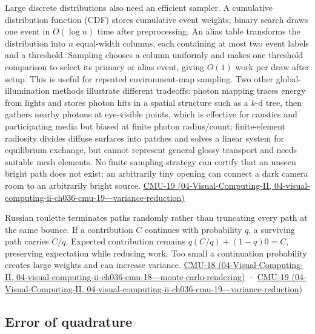 Large discrete distributions also need an efficient sampler. A cumulative distribution function (CDF) stores cumulative event weights; binary search draws one event in \(O(\log n)\) time after preprocessing. An alias table transforms the distribution into \(n\) equal-width columns, each containing at most two event labels and a threshold. Sampling chooses a column uniformly and makes one threshold comparison to select its primary or alias event, giving \(O(1)\) work per draw after setup. This is useful for repeated environment-map sampling. Two other global-illumination methods illustrate different tradeoffs: photon mapping traces energy from lights and stores photon hits in a spatial structure such as a \(k\)-d tree, then gathers nearby photons at eye-visible points, which is effective for caustics and participating media but biased at finite photon radius/count; finite-element radiosity divides diffuse surfaces into patches and solves a linear system for equilibrium exchange, but cannot represent general glossy transport and needs suitable mesh elements. No finite sampling strategy can certify that an unseen bright path does not exist: an arbitrarily tiny opening can connect a dark camera room to an arbitrarily bright source. \href{../04-Visual-Computing-II/main.pdf\#nameddest=04-visual-computing-ii-ch036-cmu-19---variance-reduction}{CMU-19 (04-Visual-Computing-II, 04-visual-computing-ii-ch036-cmu-19-\/-\/-variance-reduction)}

Russian roulette terminates paths randomly rather than truncating every path at the same bounce. If a contribution \(C\) continues with probability \(q\), a surviving path carries \(C/q\). Expected contribution remains \(q(C/q)+(1-q)0=C\), preserving expectation while reducing work. Too small a continuation probability creates large weights and can increase variance. \href{../04-Visual-Computing-II/main.pdf\#nameddest=04-visual-computing-ii-ch036-cmu-18---monte-carlo-rendering}{CMU-18 (04-Visual-Computing-II, 04-visual-computing-ii-ch036-cmu-18-\/-\/-monte-carlo-rendering)} · \href{../04-Visual-Computing-II/main.pdf\#nameddest=04-visual-computing-ii-ch036-cmu-19---variance-reduction}{CMU-19 (04-Visual-Computing-II, 04-visual-computing-ii-ch036-cmu-19-\/-\/-variance-reduction)}

\subsection{Error of quadrature}\label{03-visual-computing-i-ch012-error-of-quadrature}

